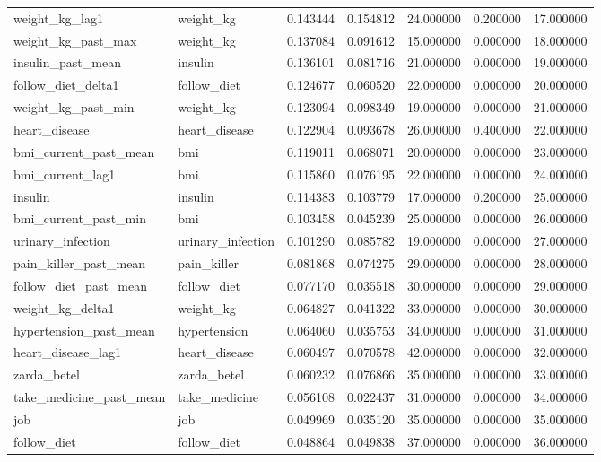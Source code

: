 \begin{longtable}{llrrrrr}
weight\_kg\_lag1 & weight\_kg & 0.143444 & 0.154812 & 24.000000 & 0.200000 & 17.000000 \\
weight\_kg\_past\_max & weight\_kg & 0.137084 & 0.091612 & 15.000000 & 0.000000 & 18.000000 \\
insulin\_past\_mean & insulin & 0.136101 & 0.081716 & 21.000000 & 0.000000 & 19.000000 \\
follow\_diet\_delta1 & follow\_diet & 0.124677 & 0.060520 & 22.000000 & 0.000000 & 20.000000 \\
weight\_kg\_past\_min & weight\_kg & 0.123094 & 0.098349 & 19.000000 & 0.000000 & 21.000000 \\
heart\_disease & heart\_disease & 0.122904 & 0.093678 & 26.000000 & 0.400000 & 22.000000 \\
bmi\_current\_past\_mean & bmi & 0.119011 & 0.068071 & 20.000000 & 0.000000 & 23.000000 \\
bmi\_current\_lag1 & bmi & 0.115860 & 0.076195 & 22.000000 & 0.000000 & 24.000000 \\
insulin & insulin & 0.114383 & 0.103779 & 17.000000 & 0.200000 & 25.000000 \\
bmi\_current\_past\_min & bmi & 0.103458 & 0.045239 & 25.000000 & 0.000000 & 26.000000 \\
urinary\_infection & urinary\_infection & 0.101290 & 0.085782 & 19.000000 & 0.000000 & 27.000000 \\
pain\_killer\_past\_mean & pain\_killer & 0.081868 & 0.074275 & 29.000000 & 0.000000 & 28.000000 \\
follow\_diet\_past\_mean & follow\_diet & 0.077170 & 0.035518 & 30.000000 & 0.000000 & 29.000000 \\
weight\_kg\_delta1 & weight\_kg & 0.064827 & 0.041322 & 33.000000 & 0.000000 & 30.000000 \\
hypertension\_past\_mean & hypertension & 0.064060 & 0.035753 & 34.000000 & 0.000000 & 31.000000 \\
heart\_disease\_lag1 & heart\_disease & 0.060497 & 0.070578 & 42.000000 & 0.000000 & 32.000000 \\
zarda\_betel & zarda\_betel & 0.060232 & 0.076866 & 35.000000 & 0.000000 & 33.000000 \\
take\_medicine\_past\_mean & take\_medicine & 0.056108 & 0.022437 & 31.000000 & 0.000000 & 34.000000 \\
job & job & 0.049969 & 0.035120 & 35.000000 & 0.000000 & 35.000000 \\
follow\_diet & follow\_diet & 0.048864 & 0.049838 & 37.000000 & 0.000000 & 36.000000 \\

\end{longtable}
